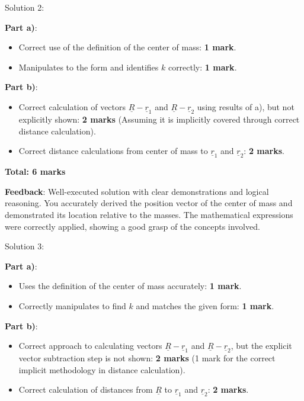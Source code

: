 \documentclass[a4paper,11pt]{article}
\begin{document}
Solution 2:

\textbf{Part a)}:
\begin{itemize}
    \item Correct use of the definition of the center of mass: \textbf{1 mark}.
    \item Manipulates to the form and identifies \( k \) correctly: \textbf{1 mark}.
\end{itemize}

\textbf{Part b)}:
\begin{itemize}
    \item Correct calculation of vectors \( \underline{R} - \underline{r}_1 \) and \( \underline{R} - \underline{r}_2 \) using results of a), but not explicitly shown: \textbf{2 marks} (Assuming it is implicitly covered through correct distance calculation).
    \item Correct distance calculations from center of mass to \( \underline{r}_1 \) and \( \underline{r}_2 \): \textbf{2 marks}.
\end{itemize}

\textbf{Total: 6 marks}

\textbf{Feedback}: Well-executed solution with clear demonstrations and logical reasoning. You accurately derived the position vector of the center of mass and demonstrated its location relative to the masses. The mathematical expressions were correctly applied, showing a good grasp of the concepts involved.

Solution 3:

\textbf{Part a)}:
\begin{itemize}
    \item Uses the definition of the center of mass accurately: \textbf{1 mark}.
    \item Correctly manipulates to find \( k \) and matches the given form: \textbf{1 mark}.
\end{itemize}

\textbf{Part b)}:
\begin{itemize}
    \item Correct approach to calculating vectors \( \underline{R} - \underline{r}_1 \) and \( \underline{R} - \underline{r}_2 \), but the explicit vector subtraction step is not shown: \textbf{2 marks} (1 mark for the correct implicit methodology in distance calculation).
    \item Correct calculation of distances from \( \underline{R} \) to \( \underline{r}_1 \) and \( \underline{r}_2 \): \textbf{2 marks}.
\end{itemize}
\end{document}
